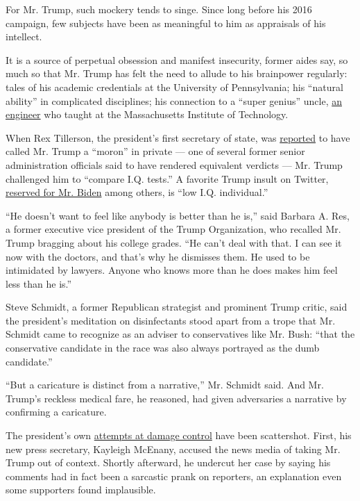 For Mr. Trump, such mockery tends to singe. Since long before his 2016
campaign, few subjects have been as meaningful to him as appraisals of
his intellect.

It is a source of perpetual obsession and manifest insecurity, former
aides say, so much so that Mr. Trump has felt the need to allude to his
brainpower regularly: tales of his academic credentials at the
University of Pennsylvania; his ``natural ability'' in complicated
disciplines; his connection to a ``super genius'' uncle,
\href{https://www.nytimes3xbfgragh.onion/1985/02/26/us/john-trump-dies-engineer-was-78.html}{an
engineer} who taught at the Massachusetts Institute of Technology.

When Rex Tillerson, the president's first secretary of state, was
\href{https://www.nbcnews.com/politics/white-house/tillerson-s-fury-trump-required-intervention-pence-n806451}{reported}
to have called Mr. Trump a ``moron'' in private --- one of several
former senior administration officials said to have rendered equivalent
verdicts --- Mr. Trump challenged him to ``compare I.Q. tests.'' A
favorite Trump insult on Twitter,
\href{https://twitter.com/realDonaldTrump/status/1107631297076305920}{reserved
for Mr. Biden} among others, is ``low I.Q. individual.''

``He doesn't want to feel like anybody is better than he is,'' said
Barbara A. Res, a former executive vice president of the Trump
Organization, who recalled Mr. Trump bragging about his college grades.
``He can't deal with that. I can see it now with the doctors, and that's
why he dismisses them. He used to be intimidated by lawyers. Anyone who
knows more than he does makes him feel less than he is.''

Steve Schmidt, a former Republican strategist and prominent Trump
critic, said the president's meditation on disinfectants stood apart
from a trope that Mr. Schmidt came to recognize as an adviser to
conservatives like Mr. Bush: ``that the conservative candidate in the
race was also always portrayed as the dumb candidate.''

``But a caricature is distinct from a narrative,'' Mr. Schmidt said. And
Mr. Trump's reckless medical fare, he reasoned, had given adversaries a
narrative by confirming a caricature.

The president's own
\href{https://www.nytimes3xbfgragh.onion/2020/04/24/us/politics/trump-inject-disinfectant-bleach-coronavirus.html}{attempts
at damage control} have been scattershot. First, his new press
secretary, Kayleigh McEnany, accused the news media of taking Mr. Trump
out of context. Shortly afterward, he undercut her case by saying his
comments had in fact been a sarcastic prank on reporters, an explanation
even some supporters found implausible.

